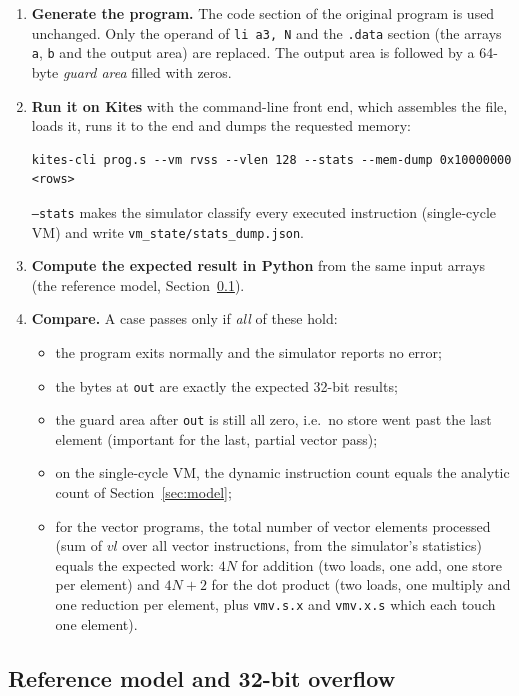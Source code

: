 \documentclass[11pt,a4paper]{article}
\newcommand{\code}[1]{\texttt{#1}}
\begin{document}
\begin{enumerate}
  \item \textbf{Generate the program.} The code section of the original program is used
        unchanged. Only the operand of \code{li a3, N} and the \code{.data} section (the arrays
        \code{a}, \code{b} and the output area) are replaced. The output area is followed by a
        64-byte \emph{guard area} filled with zeros.
  \item \textbf{Run it on Kites} with the command-line front end, which assembles the file,
        loads it, runs it to the end and dumps the requested memory:
\begin{lstlisting}[style=asm,frame=none,xleftmargin=0pt]
kites-cli prog.s --vm rvss --vlen 128 --stats --mem-dump 0x10000000 <rows>
\end{lstlisting}
        \code{--stats} makes the simulator classify every executed instruction (single-cycle
        VM) and write \code{vm\_state/stats\_dump.json}.
  \item \textbf{Compute the expected result in Python} from the same input arrays (the
        reference model, Section~\ref{sec:ref}).
  \item \textbf{Compare.} A case passes only if \emph{all} of these hold:
  \begin{itemize}
    \item the program exits normally and the simulator reports no error;
    \item the bytes at \code{out} are exactly the expected 32-bit results;
    \item the guard area after \code{out} is still all zero, i.e.\ no store went past the last
          element (important for the last, partial vector pass);
    \item on the single-cycle VM, the dynamic instruction count equals the analytic count of
          Section~\ref{sec:model};
    \item for the vector programs, the total number of vector elements processed (sum of
          $vl$ over all vector instructions, from the simulator's statistics) equals the
          expected work: $4N$ for addition (two loads, one add, one store per element) and
          $4N+2$ for the dot product (two loads, one multiply and one reduction per element,
          plus \code{vmv.s.x} and \code{vmv.x.s} which each touch one element).
  \end{itemize}
\end{enumerate}

\subsection{Reference model and 32-bit overflow}\label{sec:ref}
\end{document}
